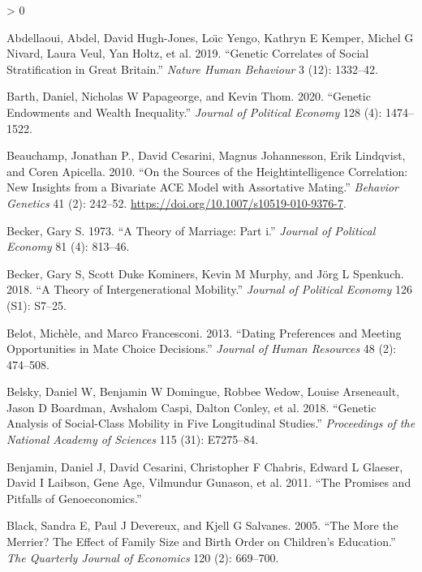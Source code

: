 \documentclass[
]{article}
\newlength{\cslhangindent}
\newenvironment{CSLReferences}[2] %
 {%
  \setlength{\parindent}{0pt}
  \ifodd #1 \everypar{\setlength{\hangindent}{\cslhangindent}}\ignorespaces\fi
  \ifnum #2 > 0
  \setlength{\parskip}{#2\baselineskip}
  \fi
 }%
 {}
\begin{document}
\hypertarget{refs}{}
\begin{CSLReferences}{1}{0}
\leavevmode\hypertarget{ref-abdellaoui2019genetic}{}%
Abdellaoui, Abdel, David Hugh-Jones, Loı̈c Yengo, Kathryn E Kemper, Michel G Nivard, Laura Veul, Yan Holtz, et al. 2019. {``Genetic Correlates of Social Stratification in Great Britain.''} \emph{Nature Human Behaviour} 3 (12): 1332--42.

\leavevmode\hypertarget{ref-barth2020genetic}{}%
Barth, Daniel, Nicholas W Papageorge, and Kevin Thom. 2020. {``Genetic Endowments and Wealth Inequality.''} \emph{Journal of Political Economy} 128 (4): 1474--1522.

\leavevmode\hypertarget{ref-Beauchamp_2010}{}%
Beauchamp, Jonathan P., David Cesarini, Magnus Johannesson, Erik Lindqvist, and Coren Apicella. 2010. {``On the Sources of the Height{{}}intelligence Correlation: New Insights from a Bivariate {ACE} Model with Assortative Mating.''} \emph{Behavior Genetics} 41 (2): 242--52. \url{https://doi.org/10.1007/s10519-010-9376-7}.

\leavevmode\hypertarget{ref-becker1973theory}{}%
Becker, Gary S. 1973. {``A Theory of Marriage: Part i.''} \emph{Journal of Political Economy} 81 (4): 813--46.

\leavevmode\hypertarget{ref-becker2018theory}{}%
Becker, Gary S, Scott Duke Kominers, Kevin M Murphy, and Jörg L Spenkuch. 2018. {``A Theory of Intergenerational Mobility.''} \emph{Journal of Political Economy} 126 (S1): S7--25.

\leavevmode\hypertarget{ref-belot2013dating}{}%
Belot, Michèle, and Marco Francesconi. 2013. {``Dating Preferences and Meeting Opportunities in Mate Choice Decisions.''} \emph{Journal of Human Resources} 48 (2): 474--508.

\leavevmode\hypertarget{ref-belsky2018genetic}{}%
Belsky, Daniel W, Benjamin W Domingue, Robbee Wedow, Louise Arseneault, Jason D Boardman, Avshalom Caspi, Dalton Conley, et al. 2018. {``Genetic Analysis of Social-Class Mobility in Five Longitudinal Studies.''} \emph{Proceedings of the National Academy of Sciences} 115 (31): E7275--84.

\leavevmode\hypertarget{ref-benjamin2011promises}{}%
Benjamin, Daniel J, David Cesarini, Christopher F Chabris, Edward L Glaeser, David I Laibson, Gene Age, Vilmundur Gunason, et al. 2011. {``The Promises and Pitfalls of Genoeconomics.''}

\leavevmode\hypertarget{ref-black2005more}{}%
Black, Sandra E, Paul J Devereux, and Kjell G Salvanes. 2005. {``The More the Merrier? The Effect of Family Size and Birth Order on Children's Education.''} \emph{The Quarterly Journal of Economics} 120 (2): 669--700.


\end{CSLReferences}
\end{document}
